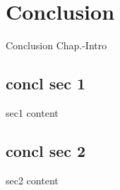\chapter{Conclusion}
\label{chap:Conclusion}  %

Conclusion Chap.-Intro

\section{concl sec 1}
\label{sec:Conclusion1}

sec1 content


\section{concl sec 2}
\label{sec:Conclusion2}

sec2 content


